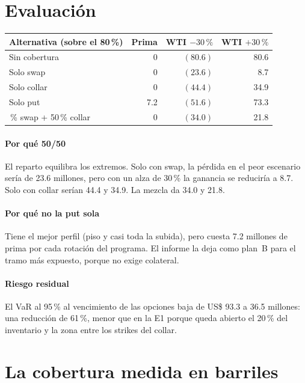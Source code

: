 \section{Evaluación}

\begin{center}\small
{}
\begin{tabularx}{\linewidth}{@{}>{\raggedright\arraybackslash}Xrrr@{}}
\toprule
Alternativa (sobre el 80\,\%) & Prima & WTI $-30\,\%$ & WTI $+30\,\%$\\
\midrule
Sin cobertura & 0 & $(80.6)$ & 80.6\\
Solo swap & 0 & $(23.6)$ & 8.7\\
Solo collar & 0 & $(44.4)$ & 34.9\\
Solo put & 7.2 & $(51.6)$ & 73.3\\
50\,\% swap + 50\,\% collar & 0 & $(34.0)$ & 21.8\\
\bottomrule
\end{tabularx}
\end{center}

\paragraph{Por qué 50/50} El reparto equilibra los extremos. Solo con swap, la pérdida en el peor escenario sería de 23.6 millones, pero con un alza de 30\,\% la ganancia se reduciría a 8.7. Solo con collar serían 44.4 y 34.9. La mezcla da 34.0 y 21.8.

\paragraph{Por qué no la put sola} Tiene el mejor perfil (piso y casi toda la subida), pero cuesta 7.2 millones de prima por cada rotación del programa. El informe la deja como plan~B para el tramo más expuesto, porque no exige colateral.

\paragraph{Riesgo residual} El VaR al 95\,\% al vencimiento de las opciones baja de US\$ 93.3 a 36.5 millones: una reducción de 61\,\%, menor que en la E1 porque queda abierto el 20\,\% del inventario y la zona entre los strikes del collar.

\section{La cobertura medida en barriles}

